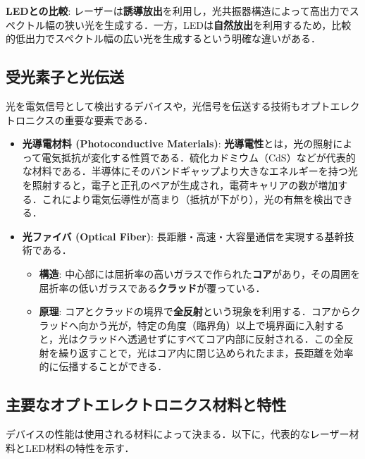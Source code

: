 \documentclass[11pt,a4paper]{ltjsarticle}
\newcommand{\supcite}[1]{\textsuperscript{\cite{#1}}}
\begin{document}
\textbf{LEDとの比較}: レーザーは\textbf{誘導放出}を利用し，光共振器構造によって高出力でスペクトル幅の狭い光を生成する．一方，LEDは\textbf{自然放出}を利用するため，比較的低出力でスペクトル幅の広い光を生成するという明確な違いがある\supcite{ref1}．

\subsection{受光素子と光伝送}

光を電気信号として検出するデバイスや，光信号を伝送する技術もオプトエレクトロニクスの重要な要素である．

\begin{itemize}
\item \textbf{光導電材料 (Photoconductive Materials)}: \textbf{光導電性}とは，光の照射によって電気抵抗が変化する性質である．硫化カドミウム（CdS）などが代表的な材料である．半導体にそのバンドギャップより大きなエネルギーを持つ光を照射すると，電子と正孔のペアが生成され，電荷キャリアの数が増加する．これにより電気伝導性が高まり（抵抗が下がり），光の有無を検出できる\supcite{ref1}．

\item \textbf{光ファイバ (Optical Fiber)}: 長距離・高速・大容量通信を実現する基幹技術である．
  \begin{itemize}
  \item \textbf{構造}: 中心部には屈折率の高いガラスで作られた\textbf{コア}があり，その周囲を屈折率の低いガラスである\textbf{クラッド}が覆っている\supcite{ref1}．
  \item \textbf{原理}: コアとクラッドの境界で\textbf{全反射}という現象を利用する．コアからクラッドへ向かう光が，特定の角度（臨界角）以上で境界面に入射すると，光はクラッドへ透過せずにすべてコア内部に反射される．この全反射を繰り返すことで，光はコア内に閉じ込められたまま，長距離を効率的に伝播することができる\supcite{ref1}．
  \end{itemize}
\end{itemize}

\subsection{主要なオプトエレクトロニクス材料と特性}

デバイスの性能は使用される材料によって決まる．以下に，代表的なレーザー材料とLED材料の特性を示す．
\end{document}
